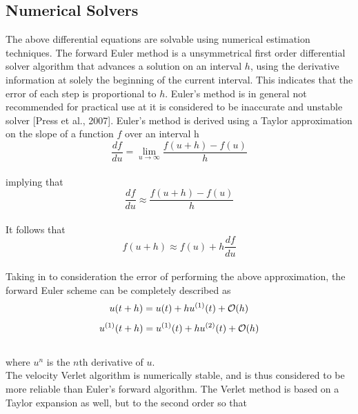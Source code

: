 \documentclass[%
reprint,nofootinbib,
amsmath,amssymb,
aps,
]{revtex4-1}
\begin{document}
\subsection{Numerical Solvers} \noindent 
The above differential equations are solvable using numerical estimation techniques.  
The forward Euler method is a unsymmetrical first order differential solver algorithm that advances a solution on an interval $h$, using the derivative information at solely the beginning of the current interval. This indicates that the error of each step is proportional to $h$. Euler's method is in general not recommended for practical use at it is considered to be inaccurate and unstable solver [Press et al., 2007]. Euler's method is derived using a Taylor approximation on the slope of a function $f$ over an interval h \vspace{3mm} \\ 
\begin{equation}
		\dfrac{df}{du} = \lim_{u\to\infty} \dfrac{f(u+h) -f(u)}{h}
\end{equation} \\ 
implying that \\ 
\begin{equation}
	\dfrac{df}{du} \approx \dfrac{f(u+h) -f(u)}{h}
\end{equation} \vspace{3mm} \\ 
It follows that \vspace{3mm}\\
\begin{equation}
	f(u+h) \approx f(u) + h\dfrac{df}{du}
\end{equation} \vspace{3mm}\\ 
Taking in to consideration the error of performing the above approximation, the forward Euler scheme can be completely described as\vspace{3mm} \\ 
\begin{equation}\label{euler1}
	u(t + h) = u(t) + hu^{(1)}(t) + \order{h}
\end{equation} 
\begin{equation}\label{euler2}
	u^{(1)}(t+h) = u^{(1)}(t) + hu^{(2)}(t) + \order{h}
\end{equation}\vspace{3mm} \\
where $u^{n}$ is the $n$th derivative of $u$. \\  \indent 
The velocity Verlet algorithm is numerically stable, and is thus considered to be more reliable than Euler's forward algorithm. The Verlet method is based on a Taylor expansion as well, but to the second order so that \vspace{3mm} \\
\end{document}
